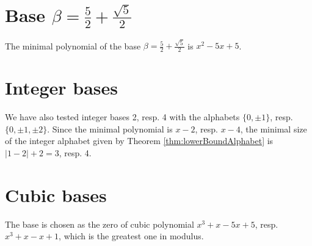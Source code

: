 \section{\texorpdfstring{Base $\beta = \frac{5}{2} + \frac{\sqrt{5}}{2}$}{Base beta = {5}/{2} + sqrt(5)/{2}}}
The minimal polynomial of the base $\beta = \frac{5}{2} + \frac{\sqrt{5}}{2}$ is $x^2 -5x+5$.


\section{Integer bases}
We have also tested integer bases 2, resp. 4 with the alphabets $\{0,\pm 1\}$, resp. $\{0,\pm 1, \pm 2\}$. Since the minimal polynomial is $x-2$, resp. $x-4$, the minimal size of the integer alphabet given by Theorem \ref{thm:lowerBoundAlphabet} is $|1-2|+2=3$, resp. 4. 



\section{Cubic bases}
The base is chosen as the zero of cubic polynomial $x^3+x-5x+5$, resp. $x^3+x-x+1$, which is the greatest one in modulus. 

